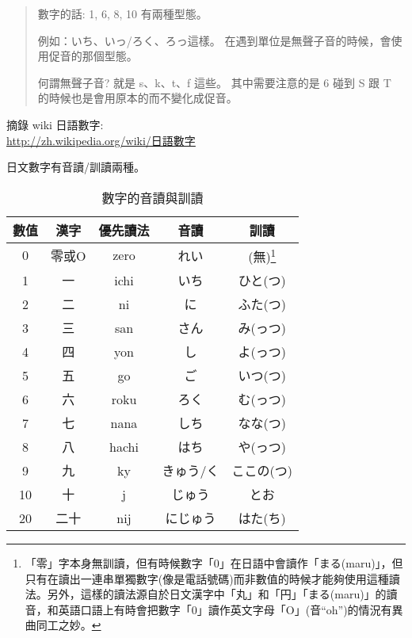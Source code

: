 \documentclass[12pt]{article}
\begin{document}
\begin{CJK}{UTF8}{cybercjk}
\begin{quote}
  數字的話: 1, 6, 8, 10 有兩種型態。

  例如：いち、いっ/ろく、ろっ這樣。
  在遇到單位是無聲子音的時候，會使用促音的那個型態。

  何謂無聲子音? 就是 s、k、t、f 這些。
  其中需要注意的是 6 碰到 S 跟 T 的時候也是會用原本的而不變化成促音。
\end{quote}

摘錄 wiki 日語數字:\\
\href{http://zh.wikipedia.org/wiki/%E6%97%A5%E8%AA%9E%E6%95%B8%E5%AD%97}{http://zh.wikipedia.org/wiki/日語數字}

日文數字有音讀/訓讀兩種。

\begin{longtable}{ccccc}
\caption{數字的音讀與訓讀}\\
數值 & 	漢字 &	優先讀法 & 音讀 & 訓讀\\
\hline
\begin{comment}
\end{comment}
0 &	零或O & zero &	れい &	(無)\footnote{「零」字本身無訓讀，但有時候數字「0」在日語中會讀作「まる(maru)」，但只有在讀出一連串單獨數字(像是電話號碼)而非數值的時候才能夠使用這種讀法。另外，這樣的讀法源自於日文漢字中「丸」和「円」「まる(maru)」的讀音，和英語口語上有時會把數字「0」讀作英文字母「O」(音``oh'')的情況有異曲同工之妙。} \\
\hline
1 &	一 &	ichi &	いち  &	ひと(つ)\\
\hline
2 &	二 &	ni &	に &	ふた(つ)\\
\hline
3 &	三 &	san &	さん &	み(っつ)\\
\hline
4 &	四 &	yon &	し &	よ(っつ)\\
\hline
5 &	五 &	go &	ご &	いつ(つ)\\
\hline
6 &	六 &	roku &	ろく  &	む(っつ)\\
\hline
7 &	七 &	nana &	しち  &	なな(つ)\\
\hline
8 &	八 &	hachi &	はち  &	や(っつ)\\
\hline
9 &	九 &	ky &	きゅう/く   &	ここの(つ)\\
\hline
10 &	十 &	j &	じゅう &	とお\\
\hline
20 &	二十 &	nij &	にじゅう &	はた(ち)\\
\hline


\end{longtable}
\end{CJK}
\end{document}
